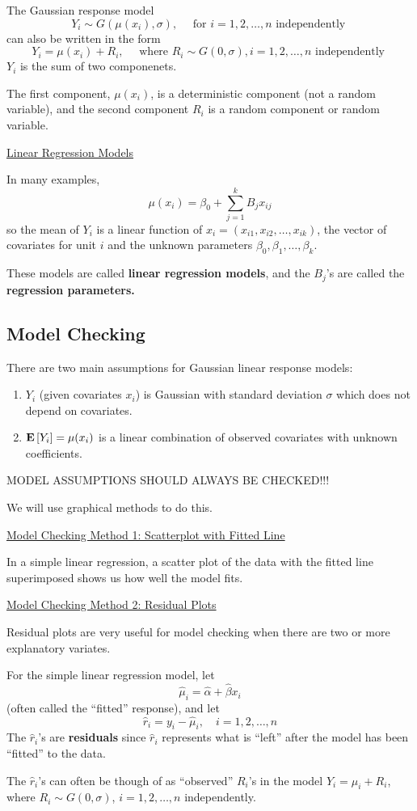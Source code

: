 The Gaussian response model
\[Y_{i} \sim G\left(\mu\left(x_{i}\right), \sigma\right), \quad \text { for } i=1,2, \ldots, n \text { independently }\]
can also be written in the form
\[Y_{i}=\mu\left(x_{i}\right)+R_{i}, \quad \text { where } R_{i} \sim G(0, \sigma), i=1,2, \ldots, n \text { independently }\]
$ Y_i $ is the sum of two componenets.

The first component, $ \mu(x_i) $, is a deterministic component (not a random variable),
and the second component $ R_i $ is a random component or random variable.

\underline{Linear Regression Models}

In many examples,
\[ \mu(x_i)=\beta_0+\sum\limits_{j=1}^{k} B_j x_{ij} \]
so the mean of $ Y_i $ is a linear function of $ x_i=(x_{i1},x_{i2},\ldots ,x_{ik}) $,
the vector of covariates for unit $ i $ and the unknown parameters $ \beta_0,\beta_1,\ldots ,\beta_k $.

These models are called \textbf{linear regression models}, and the $ B_j $'s are called the
\textbf{regression parameters.}

\subsection{Model Checking}
There are two main assumptions for Gaussian linear response models:
\begin{enumerate}
    \item $ Y_i $ (given covariates $ x_i $) is Gaussian with standard deviation $ \sigma $
          which does not depend on covariates.
    \item $ \bm{\mathrm{E}}\left[Y_i\right]=\mu(x_i) $ is a linear combination of observed covariates with
          unknown coefficients.
\end{enumerate}
\begin{center}
    MODEL ASSUMPTIONS SHOULD ALWAYS BE CHECKED!!!
\end{center}
We will use graphical methods to do this.

\underline{Model Checking Method 1: Scatterplot with Fitted Line}

In a simple linear regression, a scatter plot of the data with the fitted line superimposed
shows us how well the model fits.

\underline{Model Checking Method 2: Residual Plots}

Residual plots are very useful for model checking when there are two or more explanatory
variates.
\begin{defbox}
    \begin{definition}
        For the simple linear regression model, let
        \[ \hat{\mu}_i=\hat{\alpha}+\hat{\beta}x_i \]
        (often called the ``fitted'' response), and let
        \[ \hat{r}_i=y_i-\hat{\mu}_i,\quad i=1,2,\ldots ,n \]
        The $ \hat{r}_i $'s are \textbf{residuals} since $ \hat{r}_i $ represents
        what is ``left'' after the model has been ``fitted'' to the data.
    \end{definition}
\end{defbox}
The $ \hat{r}_i $'s can often be though of as ``observed'' $ R_i $'s in the model $ Y_i=\mu_i+R_i $,
where $ R_i\sim G(0,\sigma) $, $ i=1,2,\ldots ,n $ independently.

